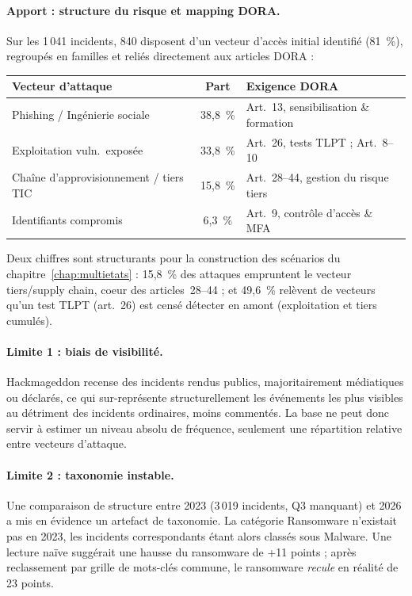 \paragraph{Apport : structure du risque et mapping DORA.} Sur les 1\,041
incidents, 840 disposent d'un vecteur d'accès initial identifié (81~\%),
regroupés en familles et reliés directement aux articles DORA :

\begin{center}
\renewcommand{\arraystretch}{1.3}
\begin{tabular}{>{\raggedright}p{5cm} c >{\raggedright\arraybackslash}p{6cm}}
\toprule
\rowcolor{lightblue}
\textbf{Vecteur d'attaque} & \textbf{Part} & \textbf{Exigence DORA} \\
\midrule
Phishing / Ingénierie sociale & 38{,}8~\% & Art.~13, sensibilisation \& formation \\
Exploitation vuln.\ exposée & 33{,}8~\% & Art.~26, tests TLPT ; Art.~8--10 \\
Chaîne d'approvisionnement / tiers TIC & 15{,}8~\% & Art.~28--44, gestion du risque tiers \\
Identifiants compromis & 6{,}3~\% & Art.~9, contrôle d'accès \& MFA \\
\bottomrule
\end{tabular}
\end{center}

Deux chiffres sont structurants pour la construction des scénarios du
chapitre~\ref{chap:multietats} : 15{,}8~\% des attaques empruntent le vecteur tiers/supply
chain, coeur des articles~28--44 ; et 49{,}6~\% relèvent de vecteurs
qu'un test TLPT (art.~26) est censé détecter en amont (exploitation et
tiers cumulés).

\paragraph{Limite 1 : biais de visibilité.} Hackmageddon recense des
incidents rendus publics, majoritairement médiatiques ou déclarés, ce qui
sur-représente structurellement les événements les plus visibles au détriment
des incidents ordinaires, moins commentés. La base ne peut donc servir à
estimer un niveau absolu de fréquence, seulement une répartition relative
entre vecteurs d'attaque.

\paragraph{Limite 2 : taxonomie instable.} Une comparaison de structure entre
2023 (3\,019 incidents, Q3 manquant) et 2026 a mis en évidence un artefact de
taxonomie. La catégorie \og Ransomware\fg{} n'existait pas en 2023, les incidents
correspondants étant alors classés sous \og Malware\fg{}. Une lecture naïve
suggérait une hausse du ransomware de +11 points ; après reclassement par
grille de mots-clés commune, le ransomware \emph{recule} en réalité de
23 points.


